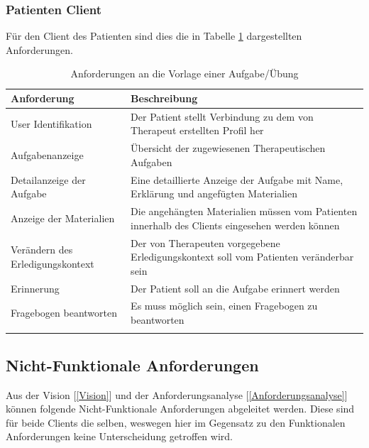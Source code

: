 
\subsubsection{Patienten Client}
Für den Client des Patienten sind dies die in Tabelle \ref{FunktionaleAnforderungenPatientClient} dargestellten Anforderungen.

\begin{table}[htbp]
	\begin{center}
		\begin{tabular}{p{4cm} p{10cm}}
			\rowcolor{black!20} \textbf{Anforderung} & \textbf{Beschreibung} \\	\toprule
			User Identifikation & Der Patient stellt Verbindung zu dem von Therapeut erstellten Profil her \\ \hline \addlinespace
			Aufgabenanzeige & Übersicht der zugewiesenen Therapeutischen Aufgaben \\
			Detailanzeige der Aufgabe  & Eine detaillierte Anzeige der Aufgabe mit Name, Erklärung und angefügten Materialien\\ \hline \addlinespace
			Anzeige der Materialien & Die angehängten Materialien müssen vom Patienten innerhalb des Clients eingesehen werden können\\ \hline \addlinespace
			Verändern des Erledigungskontext & Der von Therapeuten vorgegebene Erledigungskontext soll vom Patienten veränderbar sein \\ \hline \addlinespace
			Erinnerung & Der Patient soll an die Aufgabe erinnert werden \\ \hline \addlinespace
			Fragebogen beantworten & Es muss möglich sein, einen Fragebogen zu beantworten \\ \hline \addlinespace
		\end{tabular}
	\end{center}
	\caption{Anforderungen an die Vorlage einer Aufgabe/Übung}
	\label{FunktionaleAnforderungenPatientClient}
\end{table} 

\subsection{Nicht-Funktionale Anforderungen}
Aus der Vision [\ref{Vision}] und der Anforderungsanalyse [\ref*{Anforderungsanalyse}] können folgende Nicht-Funktionale Anforderungen abgeleitet werden. Diese sind für beide Clients die selben, weswegen hier im Gegensatz zu den Funktionalen Anforderungen keine Unterscheidung getroffen wird.

